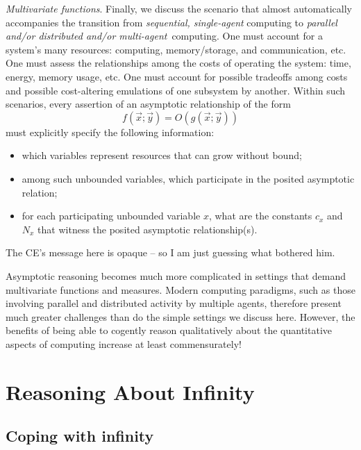 {\em Multivariate functions}.
Finally, we discuss the scenario that almost automatically accompanies the transition from {\em sequential, single-agent} computing to {\em parallel and/or distributed and/or multi-agent}~computing.  One must account for a system's many resources: computing, memory/storage, and communication, etc.  One must assess the relationships among the costs of operating the system: time, energy, memory usage, etc.  One must account for possible tradeoffs among costs and possible cost-altering emulations of one subsystem by another. Within such scenarios, every assertion of an asymptotic relationship of the form
\[ f(\vec{x}; \vec{y}) = O(g(\vec{x}; \vec{y})) \]
must explicitly specify the following information:
\begin{itemize}
\item
which variables represent resources that can grow without bound;
\medskip\item
among such unbounded variables, which participate in the posited asymptotic relation;
\medskip\item
for each participating unbounded variable $x$, what are the constants $c_x$ and $N_x$ that witness the posited asymptotic relationship(s).
\end{itemize}

\medskip

{\Arny The CE's message here is opaque -- so I am just guessing what bothered him.}

Asymptotic reasoning becomes much more complicated in settings that demand multivariate functions and measures.  Modern computing paradigms, such as those involving parallel and distributed activity by multiple agents, therefore present much greater challenges than do the 
simple settings we discuss here.  However, the benefits of being able to cogently reason qualitatively about the quantitative aspects of computing increase at least commensurately!

\section{Reasoning About Infinity}
\label{sec:reasoning-infinity}

\subsection{Coping with infinity}
\label{sec:coping-infinity}


